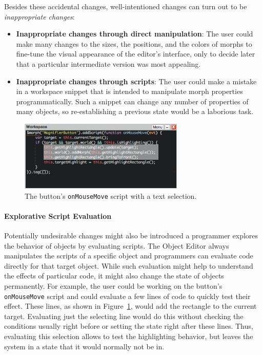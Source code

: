 Besides these accidental changes, well-intentioned changes can turn out to be \emph{inappropriate changes}:

\begin{itemize}
    \item \textbf{Inappropriate changes through direct manipulation}: The user could make many changes to the sizes, the positions, and the colors of morphs to fine-tune the visual appearance of the editor's interface, only to decide later that a particular intermediate version was most appealing.
    \item \textbf{Inappropriate changes through scripts}: The user could make a mistake in a workspace snippet that is intended to manipulate morph properties programmatically. Such a snippet can change any number of properties of many objects, so re-establishing a previous state would be a laborious task.
\end{itemize}

\begin{figure}[h]
    \centering
    \includegraphics[width=0.7\textwidth]{figures/3_motivation/4_workspaceDoIt.png}
    \caption{The button's \lstinline{onMouseMove} script with a text selection.}
    \label{fig:onMouseOverScript}
\end{figure}

\paragraph{Explorative Script Evaluation}
Potentially undesirable changes might also be introduced a programmer explores the behavior of objects by evaluating scripts.
The Object Editor always manipulates the scripts of a specific object and programmers can evaluate code directly for that target object.
While such evaluation might help to understand the effects of particular code, it might also change the state of objects permanently.
For example, the user could be working on the button's \lstinline{onMouseMove} script and could evaluate a few lines of code to quickly test their effect.
These lines, as shown in Figure~\ref{fig:onMouseOverScript}, would add the rectangle to the current target.
Evaluating just the selecting line would do this without checking the conditions usually right before or setting the state right after these lines.
Thus, evaluating this selection allows to test the highlighting behavior, but leaves the system in a state that it would normally not be in.

